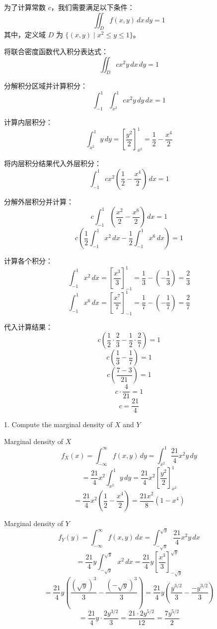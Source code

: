 \documentclass[UTF8]{report}
\theoremstyle{MyLineTheoremStyle} %
\theoremstyle{MyBlockTheoremStyle} %
\theoremstyle{MySubsubsectionStyle} %
\begin{document}
\par

为了计算常数 \( c \)，我们需要满足以下条件：
\[
\iint_{D} f(x, y) \, dx \, dy = 1
\]
其中，定义域 \( D \) 为 \( \{(x, y) \mid x^2 \leq y \leq 1\} \)。

将联合密度函数代入积分表达式：
\[
\iint_{D} cx^2y \, dx \, dy = 1
\]

分解积分区域并计算积分：
\[
\int_{-1}^{1} \int_{x^2}^{1} cx^2y \, dy \, dx = 1
\]

计算内层积分：
\[
\int_{x^2}^{1} y \, dy = \left[ \frac{y^2}{2} \right]_{x^2}^{1} = \frac{1}{2} - \frac{x^4}{2}
\]

将内层积分结果代入外层积分：
\[
\int_{-1}^{1} cx^2 \left( \frac{1}{2} - \frac{x^4}{2} \right) \, dx = 1
\]

分解外层积分并计算：
\[
c \int_{-1}^{1} \left( \frac{x^2}{2} - \frac{x^6}{2} \right) \, dx = 1
\]
\[
c \left( \frac{1}{2} \int_{-1}^{1} x^2 \, dx - \frac{1}{2} \int_{-1}^{1} x^6 \, dx \right) = 1
\]

计算各个积分：
\[
\int_{-1}^{1} x^2 \, dx = \left[ \frac{x^3}{3} \right]_{-1}^{1} = \frac{1}{3} - \left( -\frac{1}{3} \right) = \frac{2}{3}
\]
\[
\int_{-1}^{1} x^6 \, dx = \left[ \frac{x^7}{7} \right]_{-1}^{1} = \frac{1}{7} - \left( -\frac{1}{7} \right) = \frac{2}{7}
\]

代入计算结果：
\[
c \left( \frac{1}{2} \cdot \frac{2}{3} - \frac{1}{2} \cdot \frac{2}{7} \right) = 1
\]
\[
c \left( \frac{1}{3} - \frac{1}{7} \right) = 1
\]
\[
c \left( \frac{7 - 3}{21} \right) = 1
\]
\[
c \cdot \frac{4}{21} = 1
\]
\[
c = \frac{21}{4}
\]

1. Compute the marginal density of $X$ and $Y$

Marginal density of $X$
\[
f_X(x) = \int_{-\infty}^{\infty} f(x, y) \, dy = \int_{x^2}^{1} \frac{21}{4} x^2 y \, dy
\]
\[
= \frac{21}{4} x^2 \int_{x^2}^{1} y \, dy = \frac{21}{4} x^2 \left[ \frac{y^2}{2} \right]_{x^2}^{1}
\]
\[
= \frac{21}{4} x^2 \left( \frac{1}{2} - \frac{x^4}{2} \right) = \frac{21 x^2}{8} (1 - x^4)
\]

Marginal density of $Y$
\[
f_Y(y) = \int_{-\infty}^{\infty} f(x, y) \, dx = \int_{-\sqrt{y}}^{\sqrt{y}} \frac{21}{4} x^2 y \, dx
\]
\[
= \frac{21}{4} y \int_{-\sqrt{y}}^{\sqrt{y}} x^2 \, dx = \frac{21}{4} y \left[ \frac{x^3}{3} \right]_{-\sqrt{y}}^{\sqrt{y}}
\]
\[
= \frac{21}{4} y \left( \frac{(\sqrt{y})^3}{3} - \frac{(-\sqrt{y})^3}{3} \right) = \frac{21}{4} y \left( \frac{y^{3/2}}{3} - \frac{-y^{3/2}}{3} \right)
\]
\[
= \frac{21}{4} y \cdot \frac{2y^{3/2}}{3} = \frac{21 \cdot 2 y^{5/2}}{12} = \frac{7 y^{5/2}}{2}
\]
\end{document}
